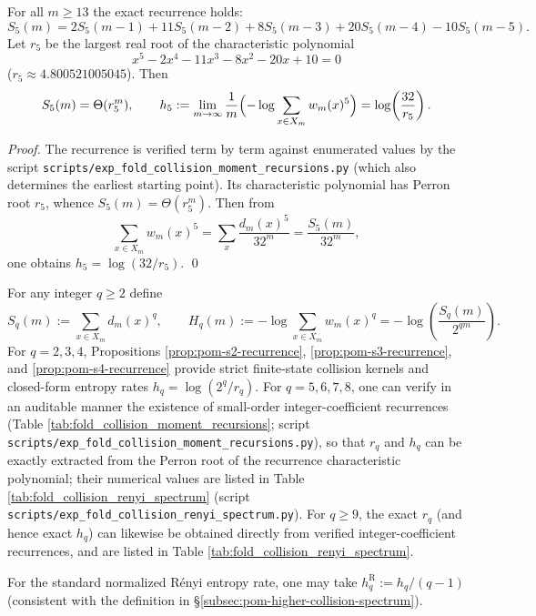 \begin{proposition}\label{prop:pom-s5-recurrence}
For all \(m\ge 13\) the exact recurrence holds:
$$
S_5(m)=2S_5(m-1)+11S_5(m-2)+8S_5(m-3)+20S_5(m-4)-10S_5(m-5).
$$
Let \(r_5\) be the largest real root of the characteristic polynomial
$$
x^5-2x^4-11x^3-8x^2-20x+10=0
$$
(\(r_5\approx 4.800521005045\)). Then
$$
S_5(m)=\Theta(r_5^m),
\qquad
h_5:=\lim_{m\to\infty}\frac{1}{m}\Bigl(-\log\sum_{x\in X_m}w_m(x)^5\Bigr)
=\log\!\left(\frac{32}{r_5}\right).
$$
\end{proposition}
\begin{proof}
The recurrence is verified term by term against enumerated values by the script \texttt{scripts/exp\_fold\_collision\_moment\_recursions.py} (which also determines the earliest starting point). Its characteristic polynomial has Perron root \(r_5\), whence \(S_5(m)=\Theta(r_5^m)\). Then from
$$
\sum_{x\in X_m}w_m(x)^5=\sum_x\frac{d_m(x)^5}{32^m}=\frac{S_5(m)}{32^m},
$$
one obtains \(h_5=\log(32/r_5)\). \qed
\end{proof}

\begin{remark}[\texorpdfstring{$\mathrm{R\acute{e}nyi}$}{Renyi} fingerprint spectrum: from \texorpdfstring{$q=2,3$}{q=2,3} to higher orders]\label{rem:pom-renyi-spectrum}
For any integer \(q\ge 2\) define
$$
S_q(m):=\sum_{x\in X_m} d_m(x)^q,\qquad
H_q(m):=-\log\sum_{x\in X_m}w_m(x)^q=-\log\!\left(\frac{S_q(m)}{2^{qm}}\right).
$$
For \(q=2,3,4\), Propositions \ref{prop:pom-s2-recurrence}, \ref{prop:pom-s3-recurrence}, and \ref{prop:pom-s4-recurrence} provide strict finite-state collision kernels and closed-form entropy rates \(h_q=\log(2^q/r_q)\).
For \(q=5,6,7,8\), one can verify in an auditable manner the existence of small-order integer-coefficient recurrences (Table \ref{tab:fold_collision_moment_recursions}; script \texttt{scripts/exp\_fold\_collision\_moment\_recursions.py}), so that \(r_q\) and \(h_q\) can be exactly extracted from the Perron root of the recurrence characteristic polynomial; their numerical values are listed in Table \ref{tab:fold_collision_renyi_spectrum} (script \texttt{scripts/exp\_fold\_collision\_renyi\_spectrum.py}).
For \(q\ge 9\), the exact \(r_q\) (and hence exact \(h_q\)) can likewise be obtained directly from verified integer-coefficient recurrences, and are listed in Table \ref{tab:fold_collision_renyi_spectrum}.
\par
For the standard normalized R\'enyi entropy rate, one may take \(h_q^{\mathrm{R}}:=h_q/(q-1)\) (consistent with the definition in \S\ref{subsec:pom-higher-collision-spectrum}).
\end{remark}

